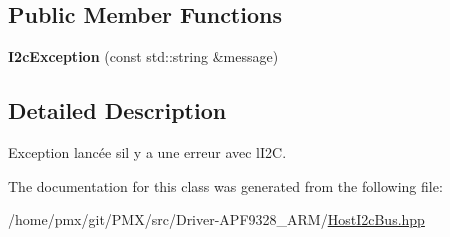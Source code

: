 \subsection*{Public Member Functions}
\begin{DoxyCompactItemize}
\item 
\mbox{\label{classI2cException_a3a1be380b5d07010d1f14b22564e61ca}} 
{\bfseries I2c\+Exception} (const std\+::string \&message)
\end{DoxyCompactItemize}


\subsection{Detailed Description}
Exception lancée s\textquotesingle{}il y a une erreur avec l\textquotesingle{}I2C. 

The documentation for this class was generated from the following file\+:\begin{DoxyCompactItemize}
\item 
/home/pmx/git/\+P\+M\+X/src/\+Driver-\/\+A\+P\+F9328\+\_\+\+A\+R\+M/\hyperlink{HostI2cBus_8hpp}{Host\+I2c\+Bus.\+hpp}\end{DoxyCompactItemize}
